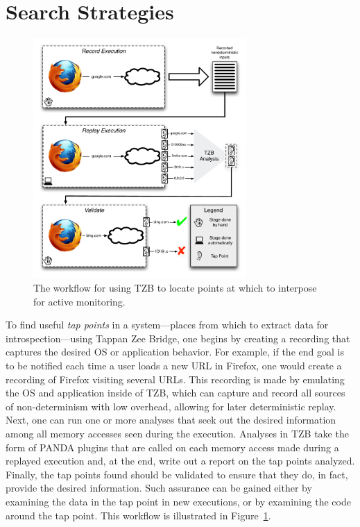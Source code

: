 \section{Search Strategies}
\label{sec:technical}

\begin{figure}
    \begin{center}
        \includegraphics[width=3.2in]{figures/tzbarch.pdf}
    \end{center}
    \caption{The workflow for using TZB to locate points at which to
    interpose for active monitoring.}
    \label{fig:workflow}
\end{figure}

To find useful \emph{tap points} in a system---places from which to
extract data for introspection---using Tappan Zee Bridge, one begins by
creating a recording that captures the desired OS or application
behavior. For example, if the end goal is to be notified each time a
user loads a new URL in Firefox, one would create a recording of Firefox
visiting several URLs. This recording is made by emulating the OS and
application inside of TZB, which can capture and record all sources of
non-determinism with low overhead, allowing for later deterministic
replay. Next, one can run one or more analyses that seek out the desired
information among all memory accesses seen during the execution.
Analyses in TZB take the form of PANDA plugins that are called on each
memory access made during a replayed execution and, at the end, write
out a report on the tap points analyzed. Finally, the tap points found
should be validated to ensure that they do, in fact, provide the desired
information. Such assurance can be gained either by examining the data
in the tap point in new executions, or by examining the code around the
tap point. This workflow is illustrated in Figure~\ref{fig:workflow}.


